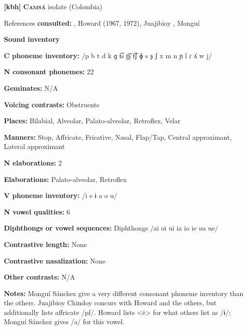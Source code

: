 \textbf{[kbh]}   \textbf{\textsc{Camsá}}  isolate (Colombia)



References \textbf{consulted:} \citet{Fabre2002}, Howard (1967, 1972), Juajibioy \citet{Chindoy1962}, Monguí \citet{Sánchez1981}



\textbf{Sound inventory}



\textbf{C phoneme inventory:} /p b t d k ɡ t͡s ʈ͡ʂ t͡ʃ ɸ s ʂ ʃ x m n ɲ l ɾ ʎ w j/



\textbf{N consonant phonemes:} 22



\textbf{Geminates:} N/A



\textbf{Voicing contrasts:} Obstruents



\textbf{Places:} Bilabial, Alveolar, Palato-alveolar, Retroflex, Velar



\textbf{Manners:} Stop, Affricate, Fricative, Nasal, Flap/Tap, Central approximant, Lateral approximant



\textbf{N elaborations:} 2



\textbf{Elaborations:} Palato-alveolar, Retroflex



\textbf{V phoneme inventory:} /i e ɨ a o u/



\textbf{N vowel qualities:} 6



\textbf{Diphthongs or vowel sequences:} Diphthongs /ai oi ui ia io ie ua ue/



\textbf{Contrastive length:} None



\textbf{Contrastive nasalization:} None



\textbf{Other contrasts:} N/A



\textbf{Notes:} Monguí Sánchez give a very different consonant phoneme inventory than the others. Juajibioy Chindoy concurs with Howard and the others, but additionally lists affricate /pf/. Howard lists <ë> for what others list as /ɨ/; Monguí Sánchez gives /ə/ for this vowel.



